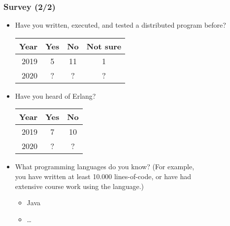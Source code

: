 \begin{frame}

\frametitle{Survey (2/2)}

\begin{itemize}

\footnotesize

\item Have you written, executed, and tested a distributed program before?

\begin{tabular}{|r|c|c|c|}
\hline
\textbf{Year} & \textbf{Yes} & \textbf{No} & \textbf{Not sure}
\\\hline
2019 & 5 & 11 & 1 \\\hline
2020 & ? & ? & ? \\\hline
\end{tabular}

\item Have you heard of Erlang?

\begin{tabular}{|r|c|c|}
\hline
\textbf{Year} & \textbf{Yes} & \textbf{No}
\\\hline
2019 & 7 & 10 \\\hline
2020 & ? & ? \\\hline
\end{tabular}

\item What programming languages do you know? (For example,\\ you have
written at least 10.000 lines-of-code, or have had\\ extensive course
work using the language.)

\begin{multicols}{2}
\begin{itemize}

\item Java

\item \ldots






\end{itemize}
\end{multicols}

\end{itemize}

\end{frame}
